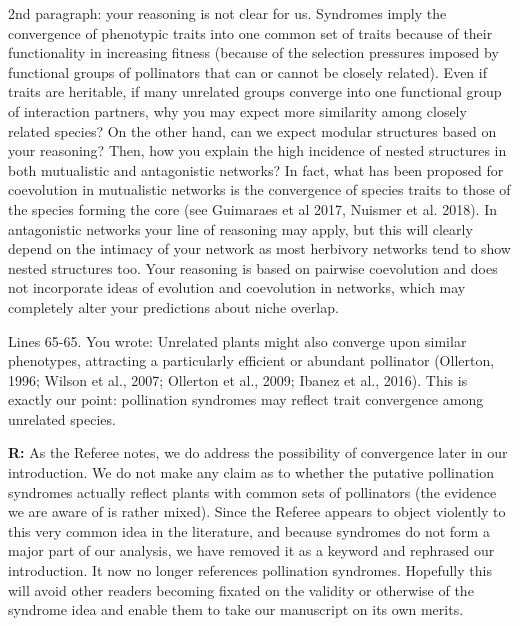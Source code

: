\documentclass[12pt]{letter}
\newenvironment{refquote}{\bigskip \begin{it}}{\end{it}\smallskip}
\begin{document}
		\begin{refquote}
			2nd paragraph: your reasoning is not clear for us. Syndromes imply the convergence of phenotypic traits into one common set of traits because of their functionality in increasing fitness (because of the selection pressures imposed by functional groups of pollinators that can or cannot be closely related). Even if traits are heritable, if many unrelated groups converge into one functional group of interaction partners, why you may expect more similarity among closely related species? On the other hand, can we expect modular structures based on your reasoning? Then, how you explain the high incidence of nested structures in both mutualistic and antagonistic networks? In fact, what has been proposed for coevolution in mutualistic networks is the convergence of species traits to those of the species forming the core (see Guimaraes et al 2017, Nuismer et al. 2018). In antagonistic networks your line of reasoning may apply, but this will clearly depend on the intimacy of your network as most herbivory networks tend to show nested structures too. Your reasoning is based on pairwise coevolution and does not incorporate ideas of evolution and coevolution in networks, which may completely alter your predictions about niche overlap.
		\end{refquote}

		\begin{refquote}
			Lines 65-65. You wrote: Unrelated plants might also converge upon similar phenotypes, attracting a particularly efficient or abundant pollinator (Ollerton, 1996; Wilson et al., 2007; Ollerton et al., 2009; Ibanez et al., 2016). This is exactly our point: pollination syndromes may reflect trait convergence among unrelated species.
		\end{refquote}


		\textbf{R:} As the Referee notes, we do address the possibility of convergence later in our introduction. We do not make any claim as to whether the putative pollination syndromes actually reflect plants with common sets of pollinators (the evidence we are aware of is rather mixed). Since the Referee appears to object violently to this very common idea in the literature, and because syndromes do not form a major part of our analysis, we have removed it as a keyword and rephrased our introduction. It now no longer references pollination syndromes. Hopefully this will avoid other readers becoming fixated on the validity or otherwise of the syndrome idea and enable them to take our manuscript on its own merits.
\end{document}
